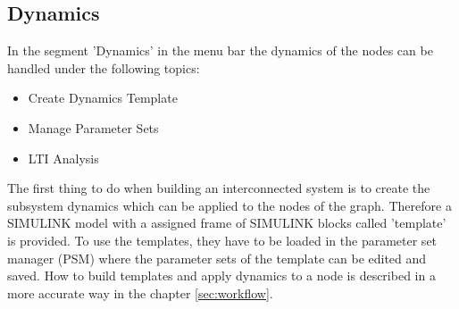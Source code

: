 \documentclass[12pt]{report}
\begin{document}
\\
\\
\\
\\
\\
\subsection{Dynamics}
\label{subsec:dynamics}
In the segment 'Dynamics' in the menu bar the dynamics of the nodes can be handled under the following topics:
\begin{itemize}
	\item Create Dynamics Template
	\item Manage Parameter Sets
	\item LTI Analysis
\end{itemize}
The first thing to do when building an interconnected system is to create the subsystem dynamics which can be applied to the nodes of the graph. Therefore a SIMULINK model with a assigned frame of SIMULINK blocks called 'template' is provided. To use the templates, they have to be loaded in the parameter set manager (PSM) where the parameter sets of the template can be edited and saved. How to build templates and apply dynamics to a node is described in a more accurate way in the chapter \ref{sec:workflow}.\\
\\
\end{document}
